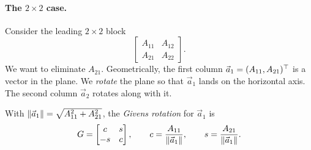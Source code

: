 \paragraph{The $2 \times 2$ case.} Consider the leading $2 \times 2$ block
\begingroup\renewcommand{\arraystretch}{1.3}
\begin{equation}
  \begin{bmatrix} A_{11} & A_{12} \\ A_{21} & A_{22} \end{bmatrix}.
\end{equation}
\endgroup
We want to eliminate $A_{21}$. Geometrically, the first column $\vec{a}_1 = (A_{11}, A_{21})^\top$ is a vector in the plane. We \emph{rotate} the plane so that $\vec{a}_1$ lands on the horizontal axis. The second column $\vec{a}_2$ rotates along with it.

\begin{center}
\end{center}

\begin{definition}
  With $\left\lVert \vec{a}_1 \right\rVert = \sqrt{A_{11}^2 + A_{21}^2}$, the \emph{Givens rotation} for $\vec{a}_1$ is
  \begingroup\renewcommand{\arraystretch}{1.3}
  \begin{equation}
    G = \begin{bmatrix} c & s \\ -s & c \end{bmatrix}, \qquad c = \frac{A_{11}}{\left\lVert \vec{a}_1 \right\rVert}, \qquad s = \frac{A_{21}}{\left\lVert \vec{a}_1 \right\rVert}.
  \end{equation}
  \endgroup
\end{definition}

